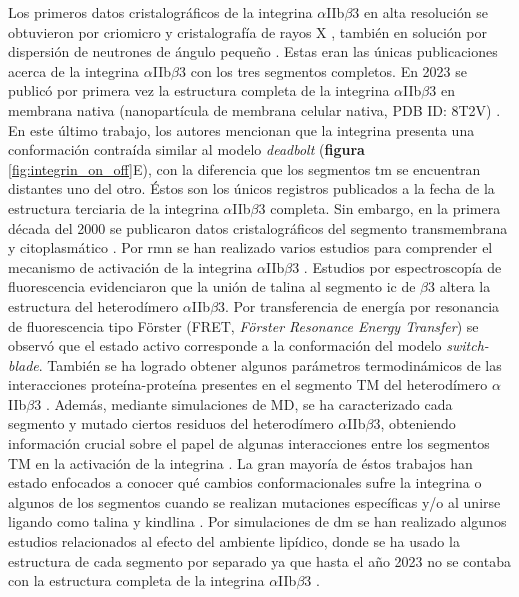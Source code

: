 Los primeros datos cristalográficos de la integrina $\alpha$IIb$\beta$3 en alta resolución se obtuvieron por \ac{criomicro} y cristalografía de rayos X \citep{Adair2002}, también en solución por dispersión de neutrones de ángulo pequeño \citep{Nogales2010}. Estas eran las únicas publicaciones acerca de la integrina $\alpha$IIb$\beta$3 con los tres segmentos completos. En 2023 se publicó por primera vez la estructura completa de la integrina $\alpha$IIb$\beta$3 en membrana nativa (nanopartícula de membrana celular nativa, PDB ID: 8T2V) \citep{Adair2023}. En este último trabajo, los autores mencionan que la integrina presenta una conformación contraída similar al modelo \textit{deadbolt} (\textbf{figura} \ref{fig:integrin_on_off}E), con la diferencia que los segmentos \ac{tm} se encuentran distantes uno del otro. Éstos son los únicos registros publicados a la fecha de la estructura terciaria de la integrina $\alpha$IIb$\beta$3 completa. Sin embargo, en la primera década del 2000 se publicaron datos cristalográficos del segmento transmembrana \citep{Lau2008, Vinogradova2004, Vinogradova2002,Yang2009, Zhu2009} y citoplasmático \citep{Zhu2008}. Por \ac{rmn} se han realizado varios estudios para comprender el mecanismo de activación de la  integrina $\alpha$IIb$\beta$3 \citep{Zhu2009, Li2001, Vinogradova2002, Beglova2002, Ma2006, Lau2009, Yang2009, Ulmer2010, Pagani2018}. Estudios por espectroscopía de fluorescencia \citep{Kim2012a} evidenciaron que la unión de talina al segmento \ac{ic} de $\beta$3 altera la estructura del heterodímero $\alpha$IIb$\beta$3. Por transferencia de energía por resonancia de fluorescencia tipo Förster (FRET, \textit{Förster Resonance Energy Transfer}) \citep{Coutinho2007} se observó que el estado activo corresponde a la conformación del modelo \textit{switch-blade}. También se ha logrado obtener algunos parámetros termodinámicos de las interacciones proteína-proteína presentes en el segmento TM del heterodímero $\alpha$IIb$\beta$3 \citep{Li2001, Situ2014}. Además, mediante simulaciones de MD, se ha caracterizado cada segmento y mutado ciertos residuos del heterodímero $\alpha$IIb$\beta$3, obteniendo información crucial sobre el papel de algunas interacciones entre los segmentos TM en la activación de la integrina \citep{Kalli2011, Mehrbod2013, Kalli2013,Zhang2017,Kalli2017, Bidone2019}.
La gran mayoría de éstos trabajos han estado enfocados a conocer qué cambios conformacionales sufre la integrina o algunos de los segmentos cuando se realizan mutaciones específicas y/o al unirse ligando como talina y kindlina \citep{Lu2022}.
Por simulaciones de \ac{dm} se han realizado algunos estudios relacionados al efecto del ambiente lipídico, donde se ha usado la estructura de cada segmento por separado ya que hasta el año 2023 no se contaba con la estructura completa de la integrina $\alpha$IIb$\beta$3 \citep{Adair2002}. 
